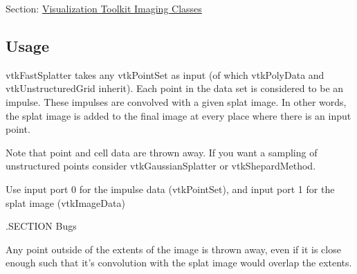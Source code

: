 Section\-: \hyperlink{sec_vtkimaging}{Visualization Toolkit Imaging Classes} \hypertarget{vtkwidgets_vtkxyplotwidget_Usage}{}\subsection{Usage}\label{vtkwidgets_vtkxyplotwidget_Usage}
vtk\-Fast\-Splatter takes any vtk\-Point\-Set as input (of which vtk\-Poly\-Data and vtk\-Unstructured\-Grid inherit). Each point in the data set is considered to be an impulse. These impulses are convolved with a given splat image. In other words, the splat image is added to the final image at every place where there is an input point.

Note that point and cell data are thrown away. If you want a sampling of unstructured points consider vtk\-Gaussian\-Splatter or vtk\-Shepard\-Method.

Use input port 0 for the impulse data (vtk\-Point\-Set), and input port 1 for the splat image (vtk\-Image\-Data)

.S\-E\-C\-T\-I\-O\-N Bugs

Any point outside of the extents of the image is thrown away, even if it is close enough such that it's convolution with the splat image would overlap the extents.


